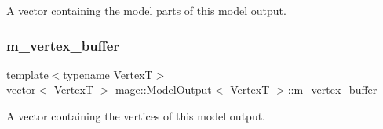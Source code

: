 A vector containing the model parts of this model output. \hypertarget{structmage_1_1_model_output_a4d669b5fee2d6a1bc993a94b0a2d5580}{}\label{structmage_1_1_model_output_a4d669b5fee2d6a1bc993a94b0a2d5580} 
\subsubsection{\texorpdfstring{m\+\_\+vertex\+\_\+buffer}{m\_vertex\_buffer}}
{\footnotesize\ttfamily template$<$typename VertexT$>$ \\
vector$<$ VertexT $>$ \hyperlink{structmage_1_1_model_output}{mage\+::\+Model\+Output}$<$ VertexT $>$\+::m\+\_\+vertex\+\_\+buffer}

A vector containing the vertices of this model output. 